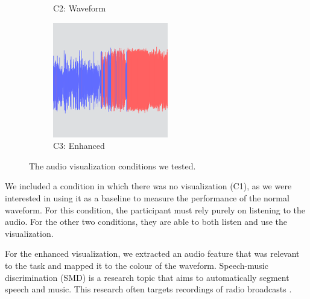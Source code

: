 \begin{figure}[ht]
\begin{subfigure}{.3\textwidth}
    \caption{C2: Waveform}
  \end{subfigure}
  \begin{subfigure}{.3\textwidth}
    \centering
    \includegraphics[width=\columnwidth]{figs/condition3.png}
    \caption{C3: Enhanced}
  \end{subfigure}
  \caption{The audio visualization conditions we tested.}
  \label{fig:conditions}
\end{figure}

We included a condition in which there was no visualization (C1), as we were interested in using it as a baseline to
measure the performance of the normal waveform. For this condition, the participant must rely purely on listening to
the audio.  For the other two conditions, they are able to both listen and use the visualization.

For the enhanced visualization, we extracted an audio feature that was relevant to the task and mapped it to the colour
of the waveform.
Speech-music discrimination (SMD) is a research topic that aims to automatically segment speech and music.  This
research often targets recordings of radio broadcasts
\citep{Goodwin2004,Wieser2014,Saunders1996,Pikrakis2008,Pikrakis2006a}.

